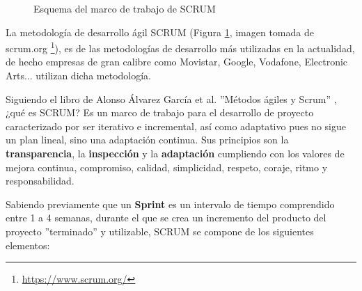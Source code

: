 \begin{figure}[H]
    \caption{Esquema del marco de trabajo de SCRUM}
    \label{fig:scrum-esquema}
\end{figure}

La metodología de desarrollo ágil SCRUM (Figura \ref{fig:scrum-esquema}, imagen tomada de scrum.org \footnote{\url{https://www.scrum.org/}}), es de las metodologías de desarrollo más utilizadas en la actualidad, de hecho empresas de gran calibre como Movistar, Google, Vodafone, Electronic Arts... utilizan dicha metodología. \bigskip

Siguiendo el libro de Alonso Álvarez García et al. ''Métodos ágiles y Scrum'' \cite{Gomez2017-id}, ¿qué es SCRUM? Es un marco de trabajo para el desarrollo de proyecto caracterizado por ser iterativo e incremental, así como adaptativo pues no sigue un plan lineal, sino una adaptación continua. Sus principios son la \textbf{transparencia}, la \textbf{inspección} y la \textbf{adaptación} cumpliendo con los valores de mejora continua, compromiso, calidad, simplicidad, respeto, coraje, ritmo y responsabilidad. \bigskip

Sabiendo previamente que un \textbf{Sprint} es un intervalo de tiempo comprendido entre 1 a 4 semanas, durante el que se crea un incremento del producto del proyecto ''terminado'' y utilizable, SCRUM se compone de los siguientes elementos:

